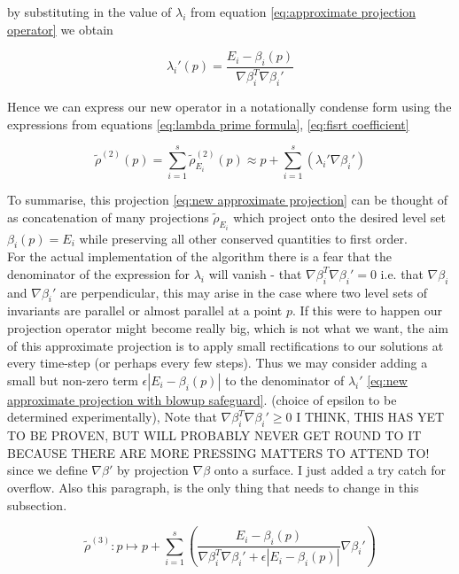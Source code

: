 \documentclass[12pt]{article}
\begin{document}
by substituting in the value of $\lambda_i$ from equation \eqref{eq:approximate projection operator} we obtain

\begin{equation}\label{eq:lambda prime formula}
    \lambda_i'(p) = \frac{E_i - \beta_i(p)}{\nabla\beta_i^T \nabla\beta_i'}
\end{equation}

Hence we can express our new operator in a notationally condense form using the expressions from equations \eqref{eq:lambda prime formula}, \eqref{eq:fisrt coefficient}

\begin{equation}\label{eq:new approximate projection}
    \widetilde\rho^{(2)}(p) = 
    \sum_{i=1}^s \widetilde\rho_{E_i}^{(2)}(p) \approx p + \sum_{i=1}^s \left( \lambda_i' \nabla\beta_i' \right)
\end{equation}

To summarise, this projection \eqref{eq:new approximate projection} can be thought of as concatenation of many projections $\widetilde\rho_{E_i}$ which project onto the desired level set $\beta_i(p)=E_i$ while preserving all other conserved quantities to first order. \\

For the actual implementation of the algorithm there is a fear that the denominator of the expression for $\lambda_i$ will vanish - that $\nabla\beta_i^T\nabla\beta_i'=0$ i.e. that $\nabla\beta_i$ and $\nabla\beta_i'$ are perpendicular, this may arise in the case where two level sets of invariants are parallel or almost parallel at a point $p$. If this were to happen our projection operator might become really big, which is not what we want, the aim of this approximate projection is to apply small rectifications to our solutions at every time-step (or perhaps every few steps).  Thus we may consider adding a small but non-zero term $\epsilon \left|E_i - \beta_i(p) \right|$ to the denominator of $\lambda_i'$  \eqref{eq:new approximate projection with blowup safeguard}. (choice of epsilon to be determined experimentally), Note that $\nabla\beta_i^T\nabla\beta_i'\geq 0$ I THINK, THIS HAS YET TO BE PROVEN, BUT WILL PROBABLY NEVER GET ROUND TO IT BECAUSE THERE ARE MORE PRESSING MATTERS TO ATTEND TO! since we define $\nabla\beta'$ by projection $\nabla\beta$ onto a surface. I just added a try catch for overflow. Also this paragraph, is the only thing that needs to change in this subsection.

\begin{equation}\label{eq:new approximate projection with blowup safeguard}
    \widetilde \rho^{(3)} : p \mapsto p + \sum_{i=1}^s \left( \frac{E_i - \beta_i(p)}{\nabla\beta_i^T\nabla\beta_i' + \epsilon\left|E_i - \beta_i(p)\right|} \nabla\beta_i' \right)
\end{equation}
\end{document}
